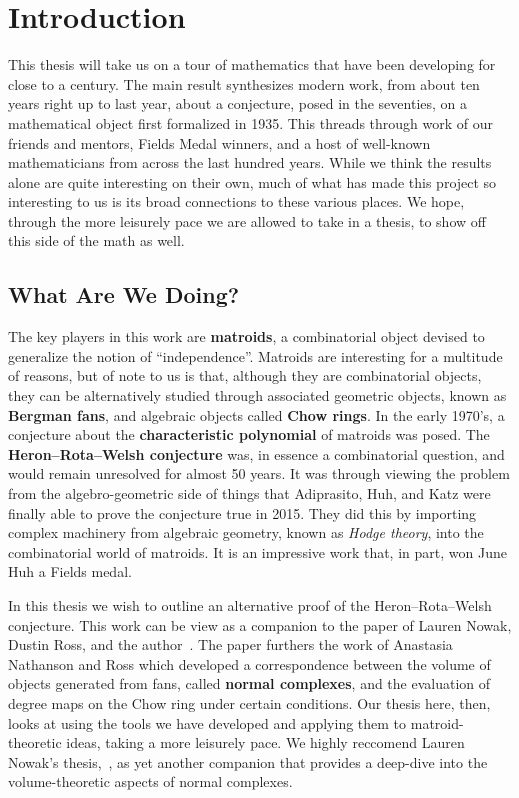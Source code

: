 \documentclass[12pt,oneside]{../../sfsuthesis}
\begin{document}
\chapter{Introduction}

This thesis will take us on a tour of mathematics that have been developing for close to a century.
The main result synthesizes modern work, from about ten years right up to last year, about a conjecture, posed in the seventies, on a mathematical object first formalized in 1935.
This threads through work of our friends and mentors, Fields Medal winners, and a host of well-known mathematicians from across the last hundred years.
While we think the results alone are quite interesting on their own, much of what has made this project so interesting to us is its broad connections to these various places.
We hope, through the more leisurely pace we are allowed to take in a thesis, to show off this side of the math as well.

\section{What Are We Doing?}

The key players in this work are \textbf{matroids}, a combinatorial object devised to generalize the notion of ``independence''.
Matroids are interesting for a multitude of reasons, but of note to us is that, although they are combinatorial objects, they can be alternatively studied through associated geometric objects, known as \textbf{Bergman fans}, and algebraic objects called \textbf{Chow rings}.
In the early 1970's, a conjecture about the \textbf{characteristic polynomial} of matroids was posed.
The \textbf{Heron--Rota--Welsh conjecture} was, in essence a combinatorial question, and would remain unresolved for almost 50 years.
It was through viewing the problem from the algebro-geometric side of things that Adiprasito, Huh, and Katz were finally able to prove the conjecture true in 2015.
They did this by importing complex machinery from algebraic geometry, known as \emph{Hodge theory}, into the combinatorial world of matroids.
It is an impressive work that, in part, won June Huh a Fields medal.

In this thesis we wish to outline an alternative proof of the Heron--Rota--Welsh conjecture.
This work can be view as a companion to the paper of Lauren Nowak, Dustin Ross, and the author~\cite{nowakMixedVolumesNormal2023}.
The paper furthers the work of Anastasia Nathanson and Ross which developed a correspondence between the volume of objects generated from fans, called \textbf{normal complexes}, and the evaluation of degree maps on the Chow ring under certain conditions.
Our thesis here, then, looks at using the tools we have developed and applying them to matroid-theoretic ideas, taking a more leisurely pace.
We highly reccomend Lauren Nowak's thesis,~\cite{nowakMixedVolumesNormal2022}, as yet another companion that provides a deep-dive into the volume-theoretic aspects of normal complexes.
\end{document}
